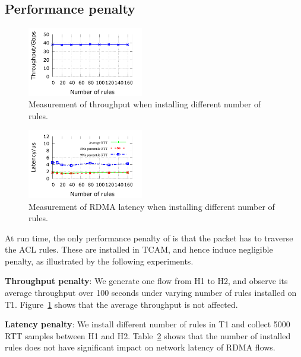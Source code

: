 \subsection{Performance penalty}\label{subsec:exp_performanceoverhead}

\begin{figure}
	\centering
	\includegraphics[width=0.45\textwidth] {figs/overhead_avgthrpt}
	\caption{Measurement of throughput when installing different number of rules.}\label{fig:thrpt_overhead}
\end{figure}

\begin{figure}
	\centering
	\includegraphics[width=0.45\textwidth] {figs/RDMAlatency_overhead}
	\caption{Measurement of RDMA latency when installing different number of rules.}\label{fig:latency_overhead}
\end{figure}

At run time, the only performance penalty of \sysname{} is that the packet has
to traverse the ACL rules. These are installed in TCAM, and hence induce
negligible penalty, as illustrated by the following experiments.

\textbf{Throughput penalty}: We generate one flow from H1 to H2, and observe
its average throughput over 100 seconds under varying number of \sysname{} rules
installed on T1. Figure~\ref{fig:thrpt_overhead} shows that the average
throughput is not affected.

\textbf{Latency penalty}: We install different number of \sysname{} rules in T1
and collect 5000 RTT samples between H1 and H2.
Table~\ref{fig:latency_overhead} shows that the number of installed rules does
not have significant impact on network latency of RDMA flows.

